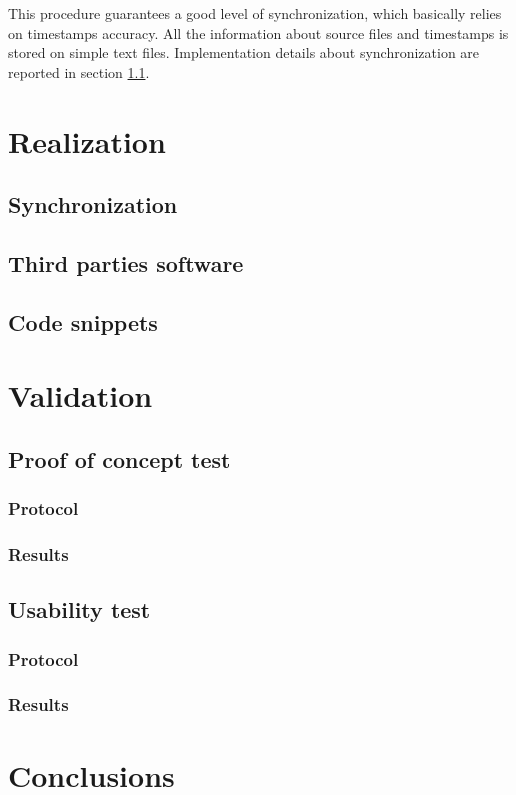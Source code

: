 \documentclass[binding=0.6cm,LaM]{sapthesis}
\begin{document}
This procedure guarantees a good level of synchronization, which basically relies on timestamps accuracy. All the information about source files and timestamps is stored on simple text files. Implementation details about synchronization are reported in section \ref{sec:syncrealization}.


\chapter{Realization}

\section{Synchronization}
\label{sec:syncrealization}


\section{Third parties software}
\label{sec:thirdparty}

\section{Code snippets}

\chapter{Validation}
\section{Proof of concept test}

\subsection{Protocol}

\subsection{Results}

\section{Usability test}

\subsection{Protocol}

\subsection{Results}

\chapter{Conclusions}

\backmatter
\cleardoublepage
{} %


\end{document}
